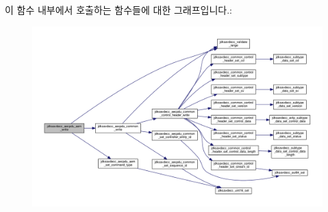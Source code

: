 이 함수 내부에서 호출하는 함수들에 대한 그래프입니다.\+:
\nopagebreak
\begin{figure}[H]
\begin{center}
\leavevmode
\includegraphics[width=350pt]{group__aecpdu__aem_gad658e55771cce77cecf7aae91e1dcbc5_cgraph}
\end{center}
\end{figure}


